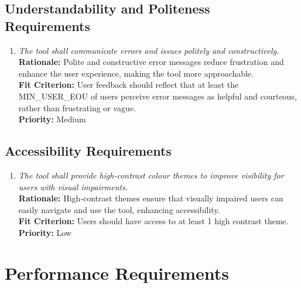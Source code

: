 \documentclass[12pt]{article}
\begin{document}
\subsection{Understandability and Politeness Requirements}
\begin{enumerate}[label=UHR-UPL \arabic*., wide=0pt, leftmargin=*]
  \item \emph{The tool shall communicate errors and issues politely
    and constructively.}\\[2mm]
    {\bf Rationale:} Polite and constructive error messages reduce
    frustration and enhance the user experience, making the tool more
    approachable.\\
    {\bf Fit Criterion:} User feedback should reflect that at least
    the MIN\_USER\_EOU of users perceive error messages as helpful
    and courteous, rather than frustrating or vague.\\
    {\bf Priority:} Medium
\end{enumerate}

\subsection{Accessibility Requirements}
\begin{enumerate}[label=UHR-ACS \arabic*., wide=0pt, leftmargin=*]
  \item \emph{The tool shall provide high-contrast colour themes to
    improve visibility for users with visual impairments.}\\[2mm]
    {\bf Rationale:} High-contrast themes ensure that visually
    impaired users can easily navigate and use the tool, enhancing
    accessibility.\\
    {\bf Fit Criterion:} Users should have access to at least 1 high
    contrast theme.\\
    {\bf Priority:} Low
\end{enumerate}

\section{Performance Requirements}
\end{document}

